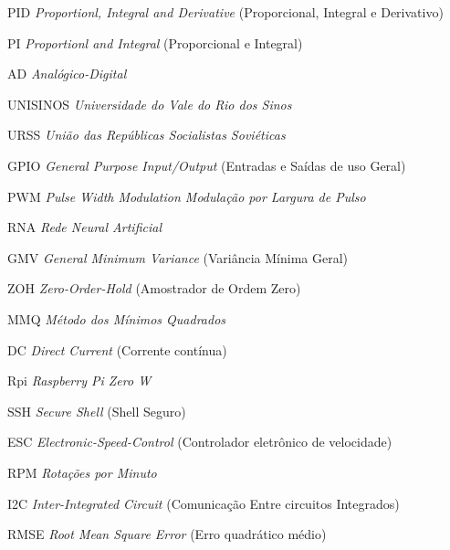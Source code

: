 \listoffigures*
\cleardoublepage
\listoftables*
\cleardoublepage
\begin{siglas}
\item[PID] \textit{Proportionl, Integral and Derivative} (Proporcional, Integral e Derivativo)
\item[PI] \textit{Proportionl and Integral} (Proporcional e Integral)
\item[AD] \textit{Analógico-Digital}
\item[UNISINOS]  \textit{Universidade do Vale do Rio dos Sinos}
\item[URSS]  \textit{União das Repúblicas Socialistas Soviéticas}
\item[GPIO]  \textit{General Purpose Input/Output} (Entradas e Saídas de uso Geral)
\item[PWM]  \textit{Pulse Width Modulation Modulação por Largura de Pulso}
\item[RNA]  \textit{Rede Neural Artificial}
\item[GMV]  \textit{General Minimum Variance} (Variância Mínima Geral)
\item[ZOH]  \textit{Zero-Order-Hold} (Amostrador de Ordem Zero)
\item[MMQ]  \textit{Método dos Mínimos Quadrados}
\item[DC]  \textit{Direct Current} (Corrente contínua)
\item[Rpi]  \textit{Raspberry Pi Zero W}
\item[SSH]  \textit{Secure Shell} (Shell Seguro)
\item[ESC]  \textit{Electronic-Speed-Control} (Controlador eletrônico de velocidade)
\item[RPM]  \textit{Rotações por Minuto}
\item[I2C]  \textit{Inter-Integrated Circuit} (Comunicação Entre circuitos Integrados)
\item[RMSE]  \textit{Root Mean Square Error} (Erro quadrático médio)
\end{siglas}
